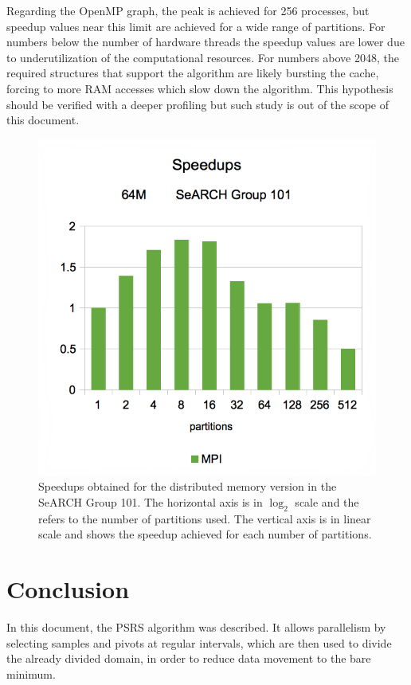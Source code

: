 \documentclass[abstract=on,9pt,twocolumn]{scrartcl}
\begin{document}
Regarding the OpenMP graph, the peak is achieved for 256 processes, but speedup values near this limit are achieved for a wide range of partitions. For numbers below the number of hardware threads the speedup values are lower due to underutilization of the computational resources. For numbers above 2048, the required structures that support the algorithm are likely bursting the cache, forcing to more RAM accesses which slow down the algorithm. This hypothesis should be verified with a deeper profiling but such study is out of the scope of this document.

\begin{figure}[t]
	\begin{center}
		\includegraphics[width=\columnwidth]{images/101-speedups-mpi.png}
	\end{center}
	\caption{Speedups obtained for the distributed memory version in the SeARCH Group 101. The horizontal axis is in $\log_{2}$ scale and the refers to the number of partitions used. The vertical axis is in linear scale and shows the speedup achieved for each number of partitions.}
	\label{fig:mpi}
\end{figure}
		


\section{Conclusion}
In this document, the PSRS algorithm was described. It allows parallelism by selecting samples and pivots at regular intervals, which are then used to divide the already divided domain, in order to reduce data movement to the bare minimum.
\end{document}
